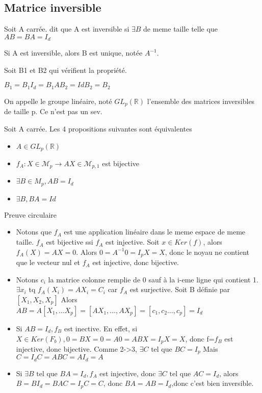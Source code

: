 \documentclass[french]{yLectureNote}
\newcommand{\R}[0]{\mathbb{R}}
\newcommand{\tq}[0]{\text{ tel que }}
\newcommand{\mc}{\mathcal}
\begin{document}
\subsection{Matrice inversible}
\begin{definition}
Soit A carrée. dit que A est inversible si \(\exists B\) de meme taille telle que \(AB = BA = I_d\)
\end{definition}
\begin{proposition}
Si A est inversible, alors B est unique, notée \(A^{-1}\).
\end{proposition}
\begin{myproof}
 Soit B1 et B2 qui vérifient la propriété.

 \(B_1 = B_1 I_d = B_1AB_2 = Id B_2 = B_2\)
\end{myproof}
On appelle le groupe linéaire, noté \(GL_p(\R)\) l'ensemble des matrices inversibles de taille p. Ce n'est pas un sev.
\begin{proposition}
Soit A carrée. Les 4 propositions suivantes sont équivalentes
\begin{itemize}
 \item \(A\in GL_p(\R)\)
 \item \(f_A : X\in \mc{M}_p \to AX \in \mc{M}_{p,1}\) est bijective
 \item \(\exists B\in M_p, AB=I_d\)
 \item \(\exists B, BA = Id\)
\end{itemize}
\begin{myproof}
 Preuve circulaire

 \begin{itemize}
  \item Notons que \(f_A\) est une application linéaire dans le meme espace de meme taille. \(f_A\) est bijective ssi \(f_A\) est injective. Soit \(x\in Ker(f)\), alors \(f_A(X) = AX = 0\). Alors \(0 = A^{-1}0 = I_p X = X\), donc le noyau ne contient que le vecteur nul et \(f_A\) est injective, donc bijective.
  \item Notons \(c_i\) la matrice colonne remplie de 0 sauf à la i-eme ligne qui contient 1.\(\exists x_i\) tq \(f_A(X_i)=AX_i = C_i\) car \(f_A\) est surjective. Soit B définie par \([X_1, X_2, X_p]\) Alors \(AB = A[X_1,\dots X_p] = [AX_1,\dots, AX_p] = [c_1,c_2\dots, c_p] = I_d\)
  \item Si \(AB=I_d, f_B\) est inective. En effet, si \(X\in Ker(F_b), 0=BX = 0 = A0 = ABX = I_pX = X\), donc f=\(f_B\) est injective, donc bijective. Comme 2->3, \(\exists C\tq BC=I_p\)
  Mais \(C = I_d C = AB C = AI_d = A\)
  \item Si \(\exists B \tq BA = I_d, f_A\) est injective, donc \(\exists C \tq AC = I_d\), alors \(B = BI_d = BAC = I_p C = C\), donc \(BA=AB = I_d\),donc c'est bien inversible.
 \end{itemize}

\end{myproof}

\end{proposition}
\end{document}
